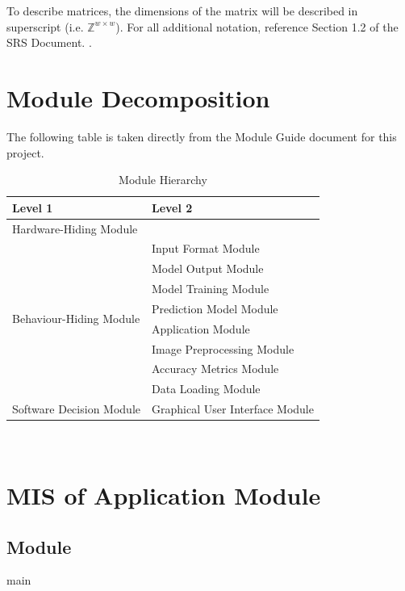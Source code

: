 \documentclass[12pt, titlepage]{article}
\begin{document}
To describe matrices, the dimensions of the matrix will be described in
superscript (i.e. ${\mathbb{Z}^{w \times w}}$). For all additional notation,
reference Section 1.2 of the SRS Document.
\citep{SRS}.

\section{Module Decomposition}

The following table is taken directly from the Module Guide document for this project.

\begin{table}[h!]
\centering
\begin{tabular}{p{} p{}}
\toprule
\textbf{Level 1} & \textbf{Level 2}\\
\midrule

{Hardware-Hiding Module} & ~ \\
\midrule

\multirow{8}{0.3\textwidth}{Behaviour-Hiding Module} &
Input Format Module\\
& Model Output Module\\
& Model Training Module\\
& Prediction Model Module\\
& Application Module\\
& Image Preprocessing Module\\
& Accuracy Metrics Module\\
& Data Loading Module\\
\midrule

\multirow{1}{0.3\textwidth}{Software Decision Module}&
Graphical User Interface Module\\
\bottomrule

\end{tabular}
\caption{Module Hierarchy}
\label{TblMH}
\end{table}

\newpage
~\newpage

\section{MIS of Application Module} \label{MApplication}

\subsection{Module}

main
\end{document}
